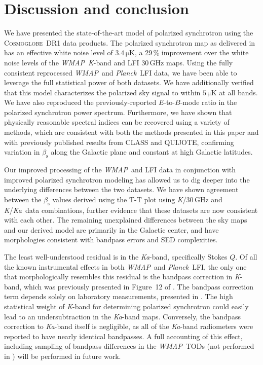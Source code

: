 \documentclass[twocolumn]{../../common/aa}
\def\WMAP{\emph{WMAP}}
\def\Planck{\emph{Planck}}
\newcommand{\cosmoglobe}{\textsc{Cosmoglobe}}
\newcommand{\K}[0]{\textit K}
\newcommand{\Ka}[0]{\textit{Ka}}
\begin{document}
\section{Discussion and conclusion}
\label{sec:conclusion}

We have presented the state-of-the-art model of polarized synchrotron using the \cosmoglobe\ DR1 data products. The polarized synchrotron map as delivered in \citet{watts2023_dr1} has an effective white noise level of $3.4\,\mathrm{\mu K}$, a 29\,\% improvement over the white noise levels of the \WMAP\ \K-band and LFI 30\,GHz maps. Using the fully consistent reprocessed \WMAP\ and \Planck\ LFI data, we have been able to leverage the full statistical power of both datasets. We have additionally verified that this model characterizes the polarized sky signal to within $5\,\mathrm{\mu K}$ at all bands. We have also reproduced the previously-reported $E$-to-$B$-mode ratio in the polarized synchrotron power spectrum. Furthermore, we have shown that physically reasonable spectral indices can be recovered using a variety of methods, which are consistent with both the methods presented in this paper and with previously published results from CLASS and QUIJOTE, confirming variation in $\beta_\mathrm s$ along the Galactic plane and constant at high Galactic latitudes.


Our improved processing of the \WMAP\ and LFI data in conjunction with improved polarized synchrotron modeling has allowed us to dig deeper into the underlying differences between the two datasets. We have shown agreement between the $\beta_\mathrm s$ values derived using the T-T plot using \K/30\,GHz and \K/\Ka\ data combinations, further evidence that these datasets are now consistent with each other. The remaining unexplained differences between the sky maps and our derived model are primarily in the Galactic center, and have morphologies consistent with bandpass errors and SED complexities.


The least well-understood residual is in the \Ka-band, specifically Stokes $Q$. Of all the known instrumental effects in both \WMAP\ and \Planck\ LFI, the only one that morphologically resembles this residual is the bandpass correction in \K-band, which was previously presented in Figure~12 of \citet{watts2023_dr1}. The bandpass correction term depends solely on laboratory measurements, presented in \citet{jarosik2003:MAP}. The high statistical weight of \K-band for determining polarized synchrotron could easily lead to an undersubtraction in the \Ka-band maps. Conversely, the bandpass correction to \Ka-band itself is negligible, as all of the \Ka-band radiometers were reported to have nearly identical bandpasses. A full accounting of this effect, including sampling of bandpass differences in the \WMAP\ TODs (not performed in \citealt{watts2023_dr1}) will be performed in future work.
\end{document}
